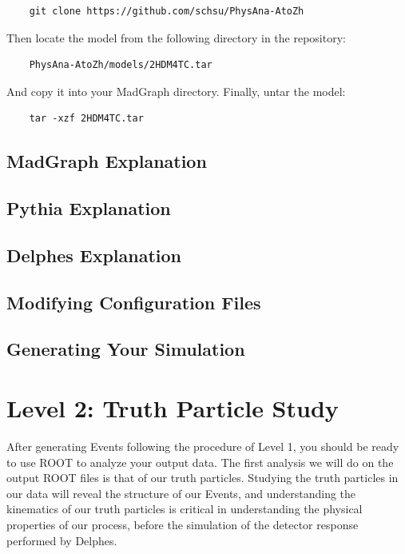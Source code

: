 \documentclass{article}
\begin{document}
\begin{verbatim}
	git clone https://github.com/schsu/PhysAna-AtoZh
\end{verbatim}

Then locate the model from the following directory in the repository:

\begin{verbatim}
	PhysAna-AtoZh/models/2HDM4TC.tar
\end{verbatim}

And copy it into your MadGraph directory. Finally, untar the model:

\begin{verbatim}
	tar -xzf 2HDM4TC.tar
\end{verbatim}

\subsection{MadGraph Explanation}

\subsection{Pythia Explanation}

\subsection{Delphes Explanation}

\subsection{Modifying Configuration Files}

\subsection{Generating Your Simulation}

\section{Level 2: Truth Particle Study}

After generating Events following the procedure of Level 1, you should be ready to use ROOT to analyze your output data. The first analysis we will do on the output ROOT files is that of our truth particles. Studying the truth particles in our data will reveal the structure of our Events, and understanding the kinematics of our truth particles is critical in understanding the physical properties of our process, before the simulation of the detector response performed by Delphes.
\end{document}
